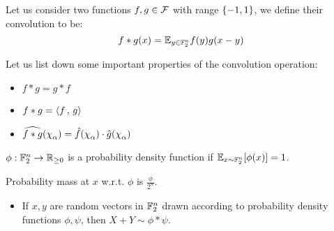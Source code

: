 \begin{definition}
    Let us consider two functions $f,g \in \mathcal{F}$ with range $\{-1,1\}$, we define their convolution to be:
    \[f*g(x) = \mathbb{E}_{y \in \mathbb{F}_2^n} f(y)g(x-y)\]
\end{definition}

Let us list down some important properties of the convolution operation:

\begin{itemize}
    \item $f * g = g * f$
    \item $f * g = \left\langle {f} \,,\, {g} \right\rangle$
    \item $\widehat{f*g}(\chi_\alpha) = \fhat(\chi_\alpha)\cdot\hat{g}(\chi_\alpha)$
\end{itemize}

\begin{definition}
    ${\phi} : {\mathbb{F}_2^n} \rightarrow {\mathbb{R}_{\geq 0}}$ is a probability density function if $\mathbb{E}_{x \sim \mathbb{F}_2^n} [\phi(x)] = 1$. 

    Probability mass at $x$ w.r.t. $\phi$ is $\frac{\phi}{2^n}$.
\end{definition}

\begin{itemize}
    \item If $x,y$ are random vectors in $\mathbb{F}_2^n$ drawn according to  probability density functions $\phi,\psi$, then $X+Y \sim \phi*\psi$.
\end{itemize}






